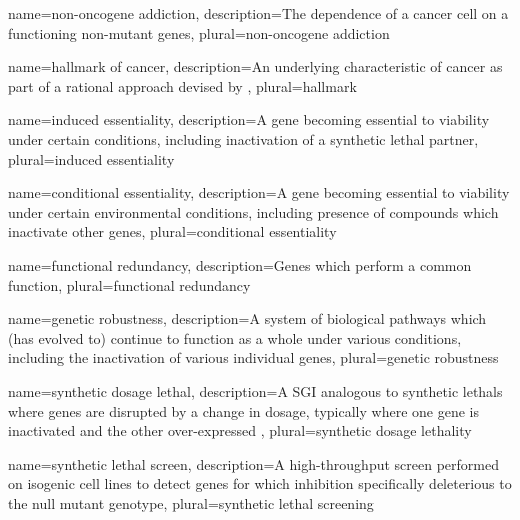 {
  name=non-oncogene addiction,
  description={The dependence of a cancer cell on a functioning non-mutant genes},
  plural=non-oncogene addiction
}


{
  name=hallmark of cancer,
  description={An underlying characteristic of cancer as part of a rational approach devised by \citep{Hanahan2000}},
  plural=hallmark
}


{
  name=induced essentiality,
  description={A gene becoming essential to viability under certain conditions, including inactivation of a synthetic lethal partner},
  plural=induced essentiality
}


{
  name=conditional essentiality,
  description={A gene becoming essential to viability under certain environmental conditions, including presence of compounds which inactivate other genes},
  plural=conditional essentiality
}


{
  name=functional redundancy, 
  description={Genes which perform a common function},
  plural=functional redundancy
}


{
  name=genetic robustness,
  description={A system of biological pathways which (has evolved to) continue to function as a whole under various conditions, including the inactivation of various individual genes},
  plural=genetic robustness
}






{
  name=synthetic dosage lethal,
  description={A \acrfull{SGI} analogous to \glspl{synthetic lethal} where genes are disrupted by a change in dosage, typically where one gene is inactivated and the other over-expressed },
  plural=synthetic dosage lethality
}


{
  name=synthetic lethal screen,
  description={A \gls{high-throughput screen} performed on isogenic cell lines to detect genes for which inhibition specifically deleterious to the null \gls{mutant} genotype},
  plural=synthetic lethal screening
}


